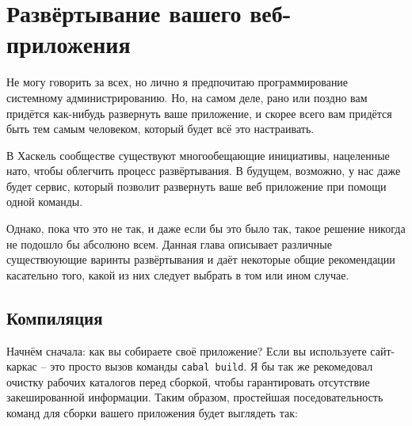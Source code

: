 \section{Развёртывание вашего веб-приложения}
%
%

Не могу говорить за всех, но лично я предпочитаю программирование системному администрированию. Но, на самом деле, рано или поздно вам придётся как-нибудь развернуть ваше приложение, и скорее всего вам придётся быть тем самым человеком, который будет всё это настраивать. 

%
В Хаскель сообществе существуют многообещающие инициативы, нацеленные нато, чтобы облегчить процесс развёртывания. В будущем, возможно, у нас даже будет сервис, который позволит развернуть ваше веб приложение при помощи одной команды.

%
Однако, пока что это не так, и даже если бы это было так, такое решение никогда не подошло бы абсолюно всем. Данная глава описывает различные существюующие варинты развёртывания и даёт некоторые общие рекомендации касательно того, какой из них следует выбрать в том или ином случае.

\subsection{Компиляция}
%
%
Начнём сначала: как вы собираете своё приложение? Если вы используете сайт-каркас %
-- это просто вызов команды \lstinline{cabal build}. Я бы так же рекомедовал очистку рабочих каталогов перед сборкой, чтобы гарантировать отсутствие закешированной информации. Таким образом, простейшая поседовательность команд для сборки вашего приложения будет выглядеть так:

